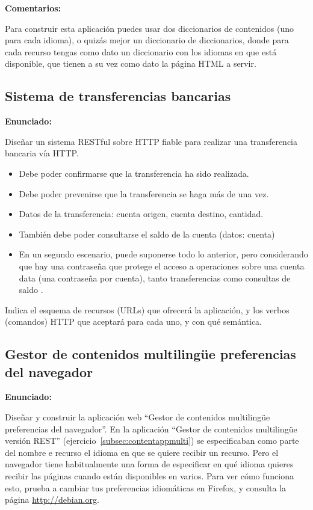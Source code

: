 \textbf{Comentarios:}

Para construir esta aplicación puedes usar dos diccionarios de contenidos (uno para cada idioma), o quizás mejor un diccionario de diccionarios, donde para cada recurso tengas como dato un diccionario con los idiomas en que está disponible, que tienen a su vez como dato la página HTML a servir.


\subsection{Sistema de transferencias bancarias}
\label{subsec:transferencias-bancarias}

\textbf{Enunciado:}

Diseñar un sistema RESTful sobre HTTP fiable para realizar una transferencia bancaria vía HTTP.

\begin{itemize}
\item Debe poder confirmarse que la transferencia ha sido realizada.
\item Debe poder prevenirse que la transferencia se haga más de una vez.
\item Datos de la transferencia: cuenta origen, cuenta destino, cantidad.
\item También debe poder consultarse el saldo de la cuenta (datos: cuenta)
\item En un segundo escenario, puede suponerse todo lo anterior, pero considerando que hay una contraseña que protege el acceso a operaciones sobre una cuenta data (una contraseña por cuenta), tanto transferencias como consultas de saldo
.
\end{itemize}

Indica el esquema de recursos (URLs) que ofrecerá la aplicación, y los verbos (comandos) HTTP que aceptará para cada uno, y con qué semántica.

\subsection{Gestor de contenidos multilingüe preferencias del navegador}
\label{subsec:contentappmulti-navegador}

\textbf{Enunciado:}

Diseñar y construir la aplicación web ``Gestor de contenidos multilingüe preferencias del navegador''. En la aplicación ``Gestor de contenidos multilingüe versión REST'' (ejercicio~\ref{subsec:contentappmulti}) se especificaban como parte del nombre e recurso el idioma en que se quiere recibir un recurso. Pero el navegador tiene habitualmente una forma de especificar en qué idioma quieres recibir las páginas cuando están disponibles en varios. Para ver cómo funciona esto, prueba a cambiar tus preferencias idiomáticas en Firefox, y consulta la página \url{http://debian.org}.

